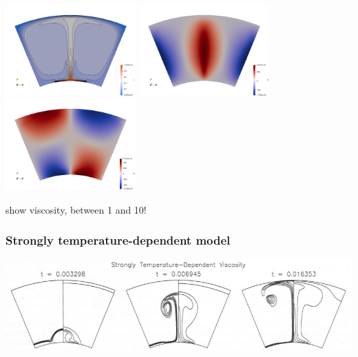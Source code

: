 \includegraphics[width=5cm]{python_codes/fieldstone_106/results/exp2/nelr24/T}
\includegraphics[width=5cm]{python_codes/fieldstone_106/results/exp2/nelr24/vr}
\includegraphics[width=5cm]{python_codes/fieldstone_106/results/exp2/nelr24/vt}

show viscosity, between 1 and 10!

\newpage
\subsubsection*{Strongly temperature-dependent model}
\begin{center}
\includegraphics[width=15cm]{python_codes/fieldstone_106/images/keki97d}
\end{center}

